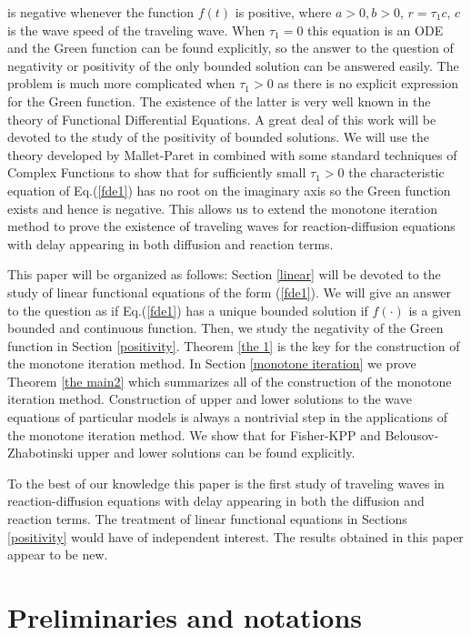 \documentclass[12pt,letterpaper]{amsart}
\theoremstyle{definition}
\theoremstyle{remark}
\numberwithin{equation}{section}
\begin{document}
is negative whenever the function $f(t)$ is positive, where $a>0,b>0$, $r=\tau_1 c$, $c$ is the wave speed of the traveling wave. When $\tau_1=0$ this equation is an ODE and the Green function can be found explicitly, so the answer to the question of negativity or positivity of the only bounded solution can be answered easily. The problem is much more complicated when $\tau_1>0$ as there is no explicit expression for the Green function. The existence of the latter is very well known in the theory of Functional Differential Equations. A great deal of this work will be devoted to the study of the positivity of bounded solutions. We will use the theory developed by Mallet-Paret in \cite{mal} combined with some standard techniques of Complex Functions to show that for sufficiently small $\tau_1>0$ the characteristic equation of Eq.(\ref{fde1}) has no root on the imaginary axis so the Green function exists and hence is negative. This allows us to extend the monotone iteration method to prove the existence of traveling waves for reaction-diffusion equations with delay appearing in both diffusion and reaction terms.

\medskip
This paper will be organized as follows: Section \ref{linear} will be devoted to the study of linear functional equations of the form (\ref{fde1}). We will give an answer to the question as if Eq.(\ref{fde1}) has a unique bounded solution if $f(\cdot )$ is a given bounded and continuous function. Then, we study the negativity of the Green function in Section \ref{positivity}. Theorem \ref{the 1} is the key for the construction of the monotone iteration method. In Section \ref{monotone iteration} we prove Theorem \ref{the main2} which summarizes all of the construction of the monotone iteration method. Construction of upper and lower solutions to the wave equations of particular models is always a nontrivial step in the applications of the monotone iteration method. We show that for Fisher-KPP and Belousov-Zhabotinski upper and lower solutions can be found explicitly.

\medskip
To the best of our knowledge this paper is the first study of traveling waves in reaction-diffusion equations with delay appearing in both the diffusion and reaction terms. The treatment of linear functional equations in Sections \ref{positivity} would have of independent interest. The results obtained in this paper appear to be new.


\section{Preliminaries and notations}
\end{document}
